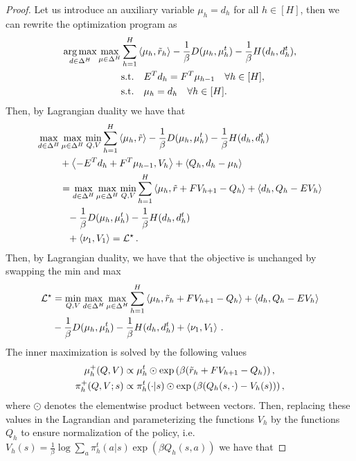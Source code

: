\begin{proof}
Let us introduce an auxiliary variable $\mu_h = d_h$ for all $h \in [H]$, then we can rewrite the optimization program as
\begin{align*}
\operatorname*{arg\,max}_{d\in\Delta^H }\max_{\mu\in\Delta^H} &\sum^H_{h=1}\left\langle{\mu_h},{\tilde{r}_h}\right\rangle - \frac{1}{\beta} D(\mu_h,\mu_h^t) - \frac{1}{\beta} H(d_h,d_h^t), \\
&\text{s.t.} \quad E^T d_h = F^T \mu_{h-1} \quad \forall h \in [H], \\
&\text{s.t.} \quad \mu_h = d_h \quad \forall h \in [H].
\end{align*}
Then, by Lagrangian duality we have that
\begin{align*}
\max_{d\in\Delta^H}&\max_{\mu\in\Delta^H} \min_{Q, V} \sum^H_{h=1}\left\langle{\mu_h},{\tilde{r}}\right\rangle - \frac{1}{\beta} D(\mu_h,\mu_h^t) - \frac{1}{\beta} H(d_h,d_h^t) \\&+ \left\langle{- E^T d_h + F^T \mu_{h-1}},{V_h}\right\rangle + \left\langle{Q_h},{d_h - \mu_h}\right\rangle \\
&=\max_{d\in\Delta^H}\max_{\mu\in\Delta^H} \min_{Q, V} 
\sum^H_{h=1}\left\langle{\mu_h},{\tilde{r} + F V_{h+1} - Q_h}\right\rangle + \left\langle{d_h},{Q_h - E V_h}\right\rangle \\&\phantom{=}- \frac{1}{\beta} D(\mu_h,\mu_h^t) - \frac{1}{\beta} H(d_h,d_h^t) \\&\phantom{=}+ \left\langle{\nu_1},{V_1}\right\rangle = \mathcal{L}^\star\,.
\end{align*}
Then, by Lagrangian duality, we have that the objective is unchanged by swapping the min and max
\begin{align*}
\mathcal{L^\star}&=\min_{Q, V}  \max_{d\in\Delta^H}\max_{\mu\in\Delta^H} 
\sum^H_{h=1}\left\langle{\mu_h},{\tilde{r}_h + F V_{h+1} - Q_h}\right\rangle + \left\langle{d_h},{Q_h - E V_h}\right\rangle \\&- \frac{1}{\beta} D(\mu_h,\mu_h^t) - \frac{1}{\beta} H(d_h,d_h^t) + \left\langle{\nu_1},{V_1}\right\rangle\,.
\end{align*}
The inner maximization is solved by the following values
\begin{align*}
    \mu^{+}_h(Q,V) &\propto \mu^t_h \odot \exp \left({\beta(\tilde{r}_h + F V_{h+1} - Q_h)}\right), \\
    \pi^{+}_h(Q,V;s) & \propto \pi^t_h(\cdot|s) \odot \exp \left({\beta(Q_h(s,\cdot) - V_h(s))}\right),
\end{align*}
where $\odot$ denotes the elementwise product between vectors. Then, replacing these values in the Lagrandian and parameterizing the functions $V_h$ by the functions $Q_h$ to ensure normalization of the policy, i.e. $V_h(s) = \frac{1}{\beta} \log \sum_a \pi^t_h(a|s)\exp(\beta Q_h(s,a))$ we have that 

\end{proof}
